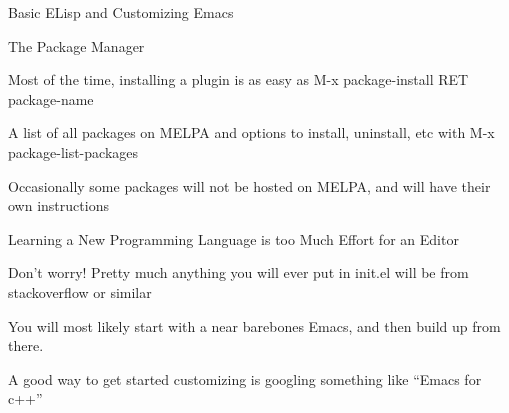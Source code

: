 \documentclass[presentation]{beamer}
\begin{document}
\begin{frame}[fragile,label=sec-5]{Basic ELisp and Customizing Emacs}
\begin{block}{The Package Manager}
\begin{block}{Most of the time, installing a plugin is as easy as M-x package-install RET package-name}
\end{block}
\begin{block}{A list of all packages on MELPA and options to install, uninstall, etc with M-x package-list-packages}
\end{block}
\begin{block}{Occasionally some packages will not be hosted on MELPA, and will have their own instructions}
\end{block}
\end{block}
\begin{block}{Learning a New Programming Language is too Much Effort for an Editor}
\begin{block}{Don't worry! Pretty much anything you will ever put in init.el will be from stackoverflow or similar}
\end{block}
\begin{block}{You will most likely start with a near barebones Emacs, and then build up from there.}
\end{block}
\begin{block}{A good way to get started customizing is googling something like ``Emacs for c++''}
\end{block}
\end{block}
\end{frame}
\end{document}

